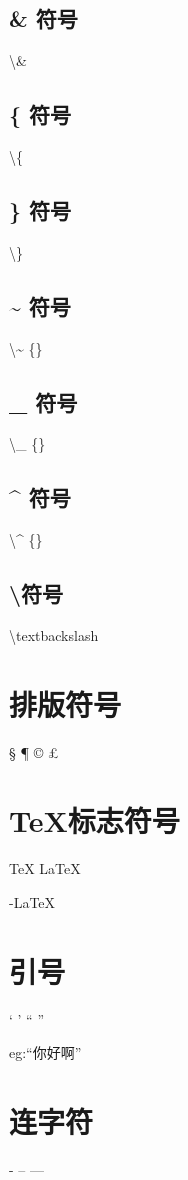 \documentclass{article}
\begin{document}
	\subsection{\& 符号}
	\textbackslash \&
	\subsection{\{ 符号}
	\textbackslash \{
	\subsection{\} 符号}
	\textbackslash \}
	\subsection{\~{} 符号}
	\textbackslash \~{} \{\}
	\subsection{\_{} 符号}
	\textbackslash \_{} \{\}
	\subsection{\^{} 符号}
	\textbackslash \^{} \{\}
	\subsection{\textbackslash 符号}
	\textbackslash textbackslash
	
	
	\section{排版符号}
	\S{} \P{} \dag{} \ddag{} \copyright{} \pounds{}
	
	\section{\TeX 标志符号}
	\TeX{}
	\LaTeX{}
	\LaTeXe{}
	
	\XeLaTeX{}
	
	\AmSTeX{} \AmS-\LaTeX{}
	\BibTeX{} \LuaTeX{}
	
	\METAFONT{} 
	\MF{} 
	\MP{}
	\section{引号}
	` ' `` '' 
	
	eg:``你好啊''
	\section{连字符}
	-
	--
	---
\end{document}
